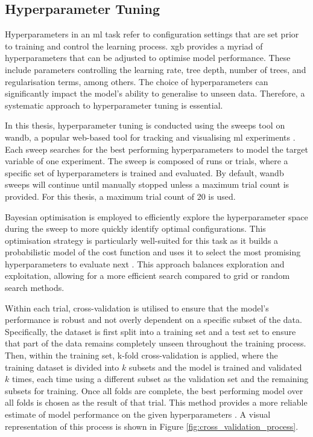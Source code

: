 \subsection{Hyperparameter Tuning}

Hyperparameters in an \acrshort{ml} task refer to configuration settings that are set prior to training and control the learning process. \acrshort{xgb} provides a myriad of hyperparameters that can be adjusted to optimise model performance. These include parameters controlling the learning rate, tree depth, number of trees, and regularisation terms, among others. The choice of hyperparameters can significantly impact the model's ability to generalise to unseen data. Therefore, a systematic approach to hyperparameter tuning is essential. 

In this thesis, hyperparameter tuning is conducted using the sweeps tool on \acrfull{wandb}, a popular web-based tool for tracking and visualising \acrshort{ml} experiments \citep{Biewald2020}. Each sweep searches for the best performing hyperparameters to model the target variable of one experiment. The sweep is composed of runs or trials, where a specific set of hyperparameters is trained and evaluated. By default, \acrshort{wandb} sweeps will continue until manually stopped unless a maximum trial count is provided. For this thesis, a maximum trial count of 20 is used.

Bayesian optimisation is employed to efficiently explore the hyperparameter space during the sweep to more quickly identify optimal configurations. This optimisation strategy is particularly well-suited for this task as it builds a probabilistic model of the cost function and uses it to select the most promising hyperparameters to evaluate next \citep{Mockus1994,Shahriari2016}. This approach balances exploration and exploitation, allowing for a more efficient search compared to grid or random search methods.

Within each trial, cross-validation is utilised to ensure that the model's performance is robust and not overly dependent on a specific subset of the data. Specifically, the dataset is first split into a training set and a test set to ensure that part of the data remains completely unseen throughout the training process. Then, within the training set, k-fold cross-validation is applied, where the training dataset is divided into $k$ subsets and the model is trained and validated $k$ times, each time using a different subset as the validation set and the remaining subsets for training. Once all folds are complete, the best performing model over all folds is chosen as the result of that trial. This method provides a more reliable estimate of model performance on the given hyperparameters \citep{Lopez2023,Singh2021}. A visual representation of this process is shown in Figure \ref{fig:cross_validation_process}.

